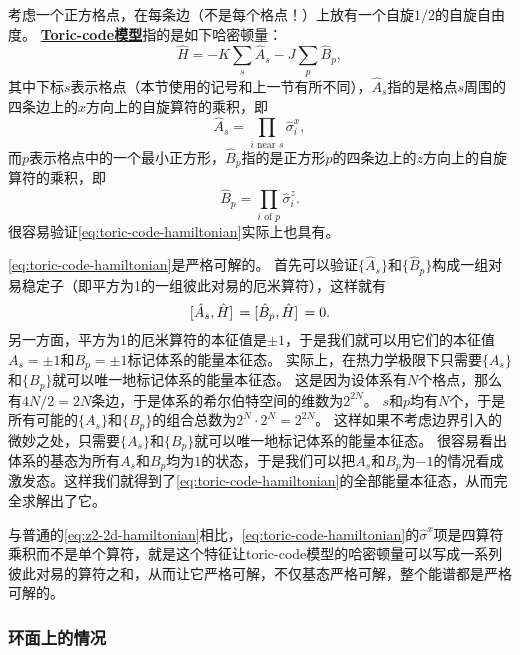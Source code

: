 \documentclass[hyperref, UTF8, a4paper]{ctexart}
\newcommand*{\concept}[1]{\underline{\textbf{#1}}}
\newcommand*{\Ztwo}{$\mathbb{Z}_2$}
\begin{document}
考虑一个正方格点，在每条边（不是每个格点！）上放有一个自旋$1/2$的自旋自由度。
\concept{Toric-code模型}指的是如下哈密顿量：
\begin{equation}
    \hat{H} = - K \sum_s \hat{A}_s - J \sum_p \hat{B}_p,
    \label{eq:toric-code-hamiltonian}
\end{equation}
其中下标$s$表示格点（本节使用的记号和上一节有所不同），$\hat{A}_s$指的是格点$s$周围的四条边上的$x$方向上的自旋算符的乘积，即
\begin{equation}
    \hat{A}_s = \prod_{i\text{ near } s} \hat{\sigma}_i^x,
\end{equation}
而$p$表示格点中的一个最小正方形，$\hat{B}_p$指的是正方形$p$的四条边上的$z$方向上的自旋算符的乘积，即
\begin{equation}
    \hat{B}_p = \prod_\text{$i$ of $p$} \hat{\sigma}_i^z.
\end{equation}
很容易验证\eqref{eq:toric-code-hamiltonian}实际上也具有。

\eqref{eq:toric-code-hamiltonian}是严格可解的。
首先可以验证$\{\hat{A}_s\}$和$\{\hat{B}_p\}$构成一组对易稳定子（即平方为1的一组彼此对易的厄米算符），这样就有
\begin{equation}
    \comm*{\hat{A}_s}{\hat{H}} = \comm*{\hat{B}_p}{\hat{H}} = 0.
\end{equation}
另一方面，平方为1的厄米算符的本征值是$\pm 1$，于是我们就可以用它们的本征值$A_s = \pm 1$和$B_p = \pm 1$标记体系的能量本征态。
实际上，在热力学极限下只需要$\{A_s\}$和$\{B_p\}$就可以唯一地标记体系的能量本征态。
这是因为设体系有$N$个格点，那么有$4N/2=2N$条边，于是体系的希尔伯特空间的维数为$2^{2N}$。
$s$和$p$均有$N$个，于是所有可能的$\{A_s\}$和$\{B_p\}$的组合总数为$2^N \cdot 2^N=2^{2N}$。
这样如果不考虑边界引入的微妙之处，只需要$\{A_s\}$和$\{B_p\}$就可以唯一地标记体系的能量本征态。
很容易看出体系的基态为所有$A_s$和$B_p$均为$1$的状态，于是我们可以把$A_s$和$B_p$为$-1$的情况看成激发态。这样我们就得到了\eqref{eq:toric-code-hamiltonian}的全部能量本征态，从而完全求解出了它。

与普通的\eqref{eq:z2-2d-hamiltonian}相比，\eqref{eq:toric-code-hamiltonian}的$\hat{\sigma}^x$项是四算符乘积而不是单个算符，就是这个特征让toric-code模型的哈密顿量可以写成一系列彼此对易的算符之和，从而让它严格可解，不仅基态严格可解，整个能谱都是严格可解的。

\subsubsection{环面上的情况}
\end{document}
